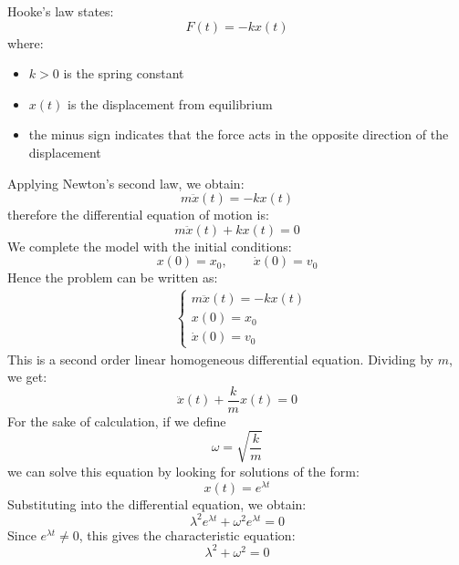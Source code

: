 \documentclass[12pt,a4paper]{article}
\begin{document}
\noindent Hooke's law states:
\begin{equation*}
	F(t) = -kx(t)
\end{equation*}
where:
\begin{itemize}
	\item $k > 0$ is the spring constant
	\item $x(t)$ is the displacement from equilibrium
	\item the minus sign indicates that the force acts in the opposite direction
	of the displacement
\end{itemize}
Applying Newton's second law, we obtain:
\begin{equation*}
	m\ddot{x}(t) = -kx(t)
\end{equation*}
therefore the differential equation of motion is:
\begin{equation*}
	m\ddot{x}(t) + kx(t) = 0
\end{equation*}
We complete the model with the initial conditions:
\begin{equation*}
	x(0) = x_0, \qquad \dot{x}(0) = v_0
\end{equation*}
Hence the problem can be written as:
\begin{align*}
	&\begin{cases}
		m\ddot{x}(t) = -kx(t)\\
		x(0) = x_0\\
		\dot{x}(0) = v_0
	\end{cases}
\end{align*}
This is a second order linear homogeneous differential equation. Dividing by
$m$, we get:
\begin{equation*}
	\ddot{x}(t) + \frac{k}{m}x(t) = 0
\end{equation*}
For the sake of calculation, if we define
\begin{equation*}
	\omega = \sqrt{\frac{k}{m}}
\end{equation*}
we can solve this equation by looking for solutions of the form:
\begin{equation*}
	x(t) = e^{\lambda t}
\end{equation*}
Substituting into the differential equation, we obtain:
\begin{equation*}
	\lambda^2 e^{\lambda t} + \omega^2 e^{\lambda t} = 0
\end{equation*}
Since $e^{\lambda t} \neq 0$, this gives the characteristic equation:
\begin{equation*}
	\lambda^2 + \omega^2 = 0
\end{equation*}
\end{document}

